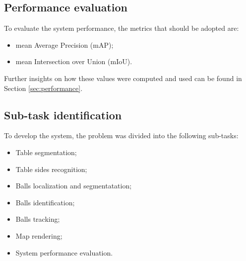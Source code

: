 



\subsection{Performance evaluation}
To evaluate the system performance, the metrics that should be adopted are:
\begin{itemize}
    \item mean Average Precision (mAP);
    \item mean Intersection over Union (mIoU).
\end{itemize}
\begin{flushleft}
Further insights on how these values were computed and used can be found in Section \ref{sec:performance}.
\end{flushleft}


\subsection{Sub-task identification}
To develop the system, the problem was divided into the following sub-tasks:
\begin{itemize}
    \item Table segmentation;
    \item Table sides recognition;
    \item Balls localization and segmentatation;
    \item Balls identification;
    \item Balls tracking;
    \item Map rendering;
    \item System performance evaluation.
\end{itemize}
